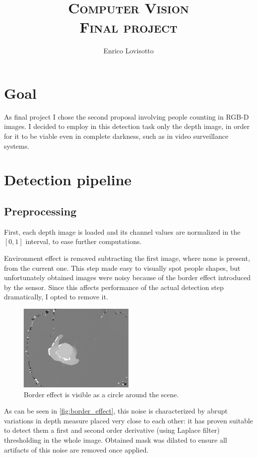 \documentclass[a4paper]{article}
\title{\textsc{Computer Vision \\Final project}}
\author{Enrico Lovisotto}
\date{ }
\begin{document}
\maketitle

\section*{Goal}

As final project I chose the second proposal involving people counting in RGB-D images.
I decided to employ in this detection task only the depth image, in order for it to be viable even in complete darkness, such as in video surveillance systems.

\section*{Detection pipeline}

\subsection*{Preprocessing}
First, each depth image is loaded and its channel values are normalized in the $[0, 1]$ interval, to ease further computations.

Environment effect is removed subtracting the first image, where none is present, from the current one.
This step made easy to visually spot people shapes, but unfortunately obtained images were noisy because of the border effect introduced by the sensor.
Since this affects performance of the actual detection step dramatically, I opted to remove it.

\begin{figure}[htp]
  \centering
  \includegraphics[width=0.5\textwidth]{results/border_effect.png}
  \caption{Border effect is visible as a circle around the scene.}
  \label{fig:border_effect}
\end{figure}

As can be seen in \autoref{fig:border_effect}, this noise is characterized by abrupt variations in depth measure placed very close to each other: it has proven suitable to detect them a first and second order derivative (using Laplace filter) thresholding in the whole image.
Obtained mask was dilated to ensure all artifacts of this noise are removed once applied.
\end{document}
